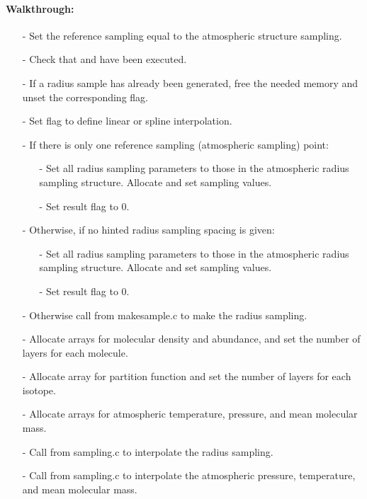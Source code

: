\documentclass[letterpaper,12pt]{article}
\begin{document}
\paragraph{Walkthrough:}
\begin{itemize}[leftmargin=10pt, noitemsep, parsep=0pt, topsep=0ex]
\item[-] Set the reference sampling equal to the atmospheric structure sampling.
\item[-] Check that  and  have
  been executed.
\item[-] If a radius sample has already been generated, free the needed memory and unset the corresponding flag.
\item[-] Set flag  to define linear or spline interpolation.
\item[-] If there is only one reference sampling (atmospheric sampling) point:
\begin{itemize}[leftmargin=10pt, noitemsep, parsep=0pt, topsep=0ex]
\item[-] Set all radius sampling parameters to those in the atmospheric radius sampling structure. Allocate and set sampling values.
\item[-] Set result flag to 0.
\end{itemize}
\item[-] Otherwise, if no hinted radius sampling spacing is given:
\begin{itemize}[leftmargin=10pt, noitemsep, parsep=0pt, topsep=0ex]
\item[-] Set all radius sampling parameters to those in the atmospheric radius sampling structure. Allocate and set sampling values.
\item[-] Set result flag to 0.
\end{itemize}
\item[-] Otherwise call  from makesample.c to make the radius sampling.
\item[-] Allocate arrays for molecular density and abundance, and set the number of layers for each molecule.
\item[-] Allocate array for partition function and set the number of layers for each isotope.
\item[-] Allocate arrays for atmospheric temperature, pressure, and mean molecular mass.
\item[-] Call  from sampling.c to interpolate the radius sampling.
\item[-] Call  from sampling.c to interpolate the atmospheric pressure, temperature, and mean molecular mass.

\end{itemize}
\end{document}
